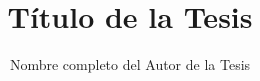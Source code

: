 \documentclass[a4paper,openany,12pt]{book}
\title{Título de la Tesis}
\author{Nombre completo del Autor de la Tesis}
\begin{document}
\theoremstyle{plane}\newtheorem{defn}[subsection]{Definición}

\maketitle 




\tableofcontents %
\listoftables %
\listoffigures %






\end{document}
